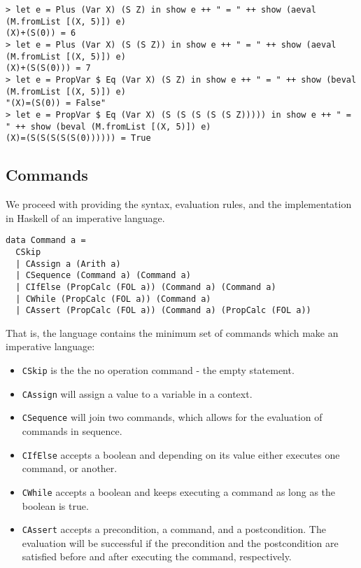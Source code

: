 \documentclass{article}
\begin{document}
\begin{lstlisting}
> let e = Plus (Var X) (S Z) in show e ++ " = " ++ show (aeval (M.fromList [(X, 5)]) e)
(X)+(S(0)) = 6
> let e = Plus (Var X) (S (S Z)) in show e ++ " = " ++ show (aeval (M.fromList [(X, 5)]) e)
(X)+(S(S(0))) = 7
> let e = PropVar $ Eq (Var X) (S Z) in show e ++ " = " ++ show (beval (M.fromList [(X, 5)]) e)
"(X)=(S(0)) = False"
> let e = PropVar $ Eq (Var X) (S (S (S (S (S Z))))) in show e ++ " = " ++ show (beval (M.fromList [(X, 5)]) e)
(X)=(S(S(S(S(S(0)))))) = True
\end{lstlisting}

\subsection{Commands}

We proceed with providing the syntax, evaluation rules, and the implementation in Haskell of an imperative language.

\begin{lstlisting}
data Command a =
  CSkip
  | CAssign a (Arith a)
  | CSequence (Command a) (Command a)
  | CIfElse (PropCalc (FOL a)) (Command a) (Command a)
  | CWhile (PropCalc (FOL a)) (Command a)
  | CAssert (PropCalc (FOL a)) (Command a) (PropCalc (FOL a))
\end{lstlisting}

That is, the language contains the minimum set of commands which make an imperative language:

\begin{itemize}
\item \texttt{CSkip} is the the no operation command - the empty statement.
\item \texttt{CAssign} will assign a value to a variable in a context.
\item \texttt{CSequence} will join two commands, which allows for the evaluation of commands in sequence.
\item \texttt{CIfElse} accepts a boolean and depending on its value either executes one command, or another.
\item \texttt{CWhile} accepts a boolean and keeps executing a command as long as the boolean is true.
\item \texttt{CAssert} accepts a precondition, a command, and a postcondition. The evaluation will be successful if the precondition and the postcondition are satisfied before and after executing the command, respectively.
\end{itemize}
\end{document}

